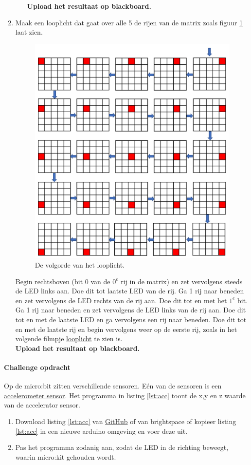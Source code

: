 \begin{enumerate}
\begin{enumerate}
\textbf{Upload het resultaat op blackboard.}
\end{enumerate}\label{opdr:loppl}
\item Maak een looplicht dat gaat over alle 5 de rijen van de matrix zoals figuur \ref{fig:loopl} laat zien.

\begin{figure}[H]
	\captionsetup{justification=centering}
\includegraphics[width=0.6 \linewidth]{figuren/looplicht}
\centering
\caption{De volgorde van het looplicht.}
\label{fig:loopl}
\end{figure}

Begin rechtsboven (bit 0 van de ${0^{e}}$ rij in de matrix) en zet vervolgens steeds de LED links aan. Doe dit tot laatste LED van de rij.
Ga 1 rij naar beneden en zet vervolgens de LED rechts van de rij aan. Doe dit tot en met het $1^{e}$ bit.
Ga 1 rij naar beneden en zet vervolgens de LED links van de rij aan. Doe dit tot en met de laatste LED en ga vervolgens een rij naar beneden.
Doe dit tot en met de laatste rij en begin vervolgens weer op de eerste rij, zoals in het volgende filmpje \href{https://www.youtube.com/shorts/8ZyYWEiXsm0} {
	looplicht}
	te zien is.\\
\textbf{Upload het resultaat op blackboard.}
\end{enumerate}

\paragraph{Challenge opdracht}\label{opdr:accSens}

Op de micro:bit zitten verschillende sensoren. Eén van de sensoren is een \href{https://youtu.be/9WAckt2vrrQ}{accelerometer sensor}.
Het programma in listing \ref{lst:acc} toont de x,y en z waarde van de accelerator sensor.
\begin{enumerate}

	\item Download  listing \ref{lst:acc} van \href{https://github.com/JohnVi-hhs/embsysP/tree/main/voorbeelden/accelerator.ino}{ GitHub} of van brightspace of kopieer listing \ref{lst:acc} in een nieuwe arduino omgeving en voer deze uit.
	\item Pas het programma zodanig aan, zodat de LED in de richting beweegt, waarin micro:kit gehouden wordt.

	\end{enumerate}


